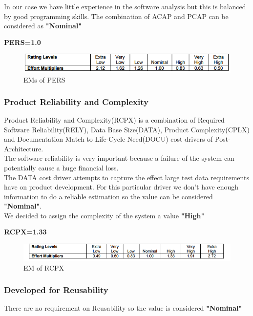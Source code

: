 			In our case we have little experience in the software analysis but this is balanced by good programming skills. The combination of ACAP and PCAP can be considered as \textbf{"Nominal"}
			
			\textbf{PERS=1.0}
\begin{figure}[H] 
	\centering
	\includegraphics[scale = 0.6]{img/PERS.png}
	\caption{EMs of PERS}
\end{figure}
		

			
\subsubsection{Product Reliability and Complexity}
	Product Reliability and Complexity(RCPX) is a combination of Required Software Reliability(RELY), Data Base Size(DATA), Product Complexity(CPLX) and Documentation Match to Life-Cycle Need(DOCU) cost drivers of Post-Architecture. 
			\\
			The software reliability is very important because a failure of the system can potentially cause a huge financial loss.\\
			The DATA cost driver attempts to capture the effect large test data requirements have on product development. For this particular driver we don’t have enough information to do a reliable estimation so the value can be considered \textbf{"Nominal"}.\\
			We decided to assign the complexity of the system a value \textbf{"High"}
			
		
			\textbf{RCPX=1.33}

\begin{figure}[H] 
	\centering
	\includegraphics[scale = 0.6]{img/RCPX.png}
	\caption{EM of RCPX}
\end{figure}
	
		
\subsubsection{Developed for Reusability}		
			There are no requirement on Reusability so the value is considered \textbf{"Nominal"}
			
